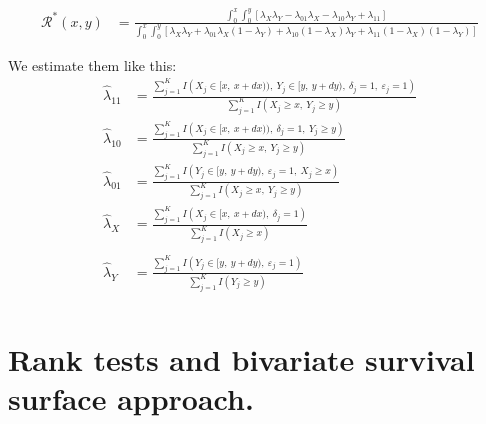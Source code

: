 \documentclass[]{article}
\let\epsilon\varepsilon
\begin{document}
	$$
	\begin{aligned}
		\mathcal{R}^*(x, y) &=
    \frac{\int_0^x \int_0^y [\lambda_X \lambda_Y -\lambda_{01}\lambda_X-\lambda_{10}\lambda_Y +\lambda_{11}]}{\int_0^x \int_0^y [\lambda_X \lambda_Y+\lambda_{01}\lambda_X(1 - \lambda_Y)+\lambda_{10}(1 - \lambda_X)\lambda_Y+\lambda_{11}(1 - \lambda_X)(1 - \lambda_Y)]}
	\end{aligned}
	$$

We estimate them like this:
	$$
	\begin{aligned}
		\hat{\lambda}_{11} &= \frac{\sum_{j = 1}^K I \left(X_j \in [x,~x+dx)),~Y_j \in [y,~y+dy),~\delta_j = 1,~\epsilon_j = 1  \right) }{\sum_{j = 1}^K I \left(X_j \geq x,~ Y_j\geq y   \right) }\\
    \hat{\lambda}_{10} &= \frac{\sum_{j = 1}^K I \left(X_j \in [x,~x+dx)),~\delta_j = 1,~ Y_j\geq y   \right) }{\sum_{j = 1}^K I \left(X_j \geq x,~ Y_j\geq y   \right) }\\
    \hat{\lambda}_{01}  &= \frac{\sum_{j = 1}^K I \left(Y_j \in [y,~y+dy),~\epsilon_j = 1,~X_j \geq x \right) }{\sum_{j = 1}^K I \left(X_j \geq x,~ Y_j\geq y   \right) }\\
    \hat{\lambda}_X &= \frac{\sum_{j = 1}^K I \left(X_j \in [x,~x+dx),~\delta_j = 1 \right) }{\sum_{j = 1}^K I \left(X_j \geq x   \right) }\\\\
    \hat{\lambda}_Y &= \frac{\sum_{j = 1}^K I \left(Y_j \in [y,~y+dy),~\epsilon_j = 1 \right) }{\sum_{j = 1}^K I \left(Y_j\geq y   \right) }\\
	\end{aligned}
	$$


\section{Rank tests and bivariate survival surface approach.}
\end{document}
